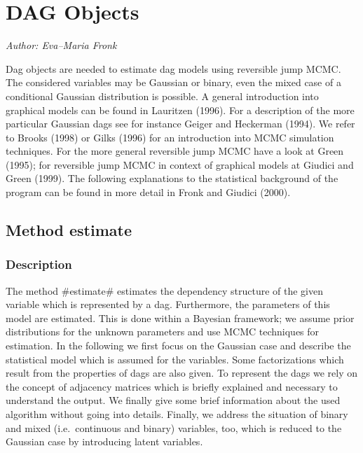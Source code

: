 \chapter{DAG Objects}
  \label{dag}

{\em Author: Eva--Maria Fronk} \\
\vspace{0.3cm}



Dag objects are needed to estimate dag models using reversible
jump MCMC. The considered variables may be Gaussian or binary,
even the mixed case of a conditional Gaussian distribution is
possible. A general introduction into graphical models can be
found in Lauritzen (1996). For a description of the more
particular Gaussian dags see for instance Geiger and Heckerman
(1994). We refer to Brooks (1998) or Gilks (1996) for an
introduction into MCMC simulation techniques. For the more general
reversible jump MCMC have a look at Green (1995); for reversible
jump MCMC in context of graphical models at Giudici and Green
(1999). The following explanations to the statistical background
of the program can be found in more detail in Fronk and Giudici
(2000).



\section{Method estimate}



\subsection{Description}

The method #estimate# estimates the dependency structure of the
given variable which is represented by a dag. Furthermore, the
parameters of this model are estimated. This is done within a
Bayesian framework; we assume prior distributions for the unknown
parameters and use MCMC techniques for estimation. In the
following we first focus on the Gaussian case  and describe the
statistical model which is assumed for the variables. Some
factorizations which result from the properties of dags are also
given. To represent the dags we rely on the concept of adjacency
matrices which is briefly explained and necessary to understand
the output. We finally give some brief information about the used
algorithm without going into details. Finally, we address the
situation of binary and mixed (i.e.~continuous and binary)
variables, too, which is reduced to the Gaussian case by
introducing latent variables.


